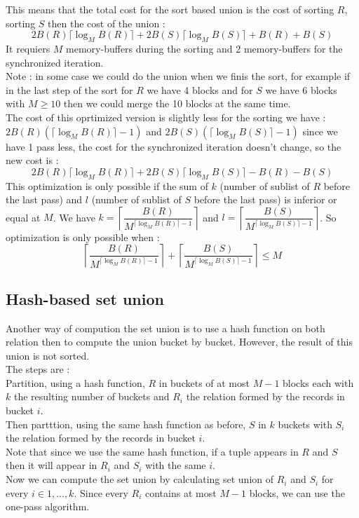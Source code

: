 \documentclass[12pt,a4paper]{article}
\begin{document}
This means that the total cost for the sort based union is the cost of sorting $R$, sorting $S$ then the cost of the union : 
$$2B(R) \lceil \log_M B(R) \rceil + 2B(S) \lceil \log_M B(S) \rceil + B(R) + B(S)$$
It requiers $M$ memory-buffers during the sorting and 2 memory-buffers for the synchronized iteration.\\
Note : in some case we could do the union when we finis the sort, for example if in the last step of the sort for $R$ we have 4 blocks and for $S$ we have 6 blocks with $M \geq 10$ then we could merge the 10 blocks at the same time.\\
The cost of this oprtimized version is slightly less for the sorting we have :\\
$2B(R) (\lceil \log_M B(R) \rceil - 1)$ and $2B(S) (\lceil \log_M B(S) \rceil - 1)$ since we have 1 pass less, the cost for the synchronized iteration doesn't change, so the new cost is :
$$2B(R) \lceil \log_M B(R) \rceil + 2B(S) \lceil \log_M B(S) \rceil - B(R) - B(S)$$
This optimization is only possible if the sum of $k$ (number of sublist of $R$ before the last pass) and $l$ (number of sublist of $S$ before the last pass) is inferior or equal at $M$. We have $k = \left\lceil \dfrac{B(R)}{M^{\lceil \log_M B(R) \rceil - 1}} \right\rceil$ and $l = \left\lceil \dfrac{B(S)}{M^{\lceil \log_M B(S) \rceil - 1}} \right\rceil$. So optimization is only possible when :
$$ \left\lceil \dfrac{B(R)}{M^{\lceil \log_M B(R) \rceil - 1}} \right\rceil + \left\lceil \dfrac{B(S)}{M^{\lceil \log_M B(S) \rceil - 1}} \right\rceil \leq M $$

\subsection{Hash-based set union}
Another way of compution the set union is to use a hash function on both relation then to compute the union bucket by bucket. However, the result of this union is not sorted.\\
The steps are : \\
Partition, using a hash function, $R$ in buckets of at most $M-1$ blocks each with $k$ the resulting number of buckets and $R_i$ the relation formed by the records in bucket $i$.\\
Then partttion, using the same hash function as before, $S$ in $k$ buckets with $S_i$ the relation formed by the records in bucket $i$.\\
Note that since we use the same hash function, if a tuple appears in $R$ and $S$ then it will appear in $R_i$ and $S_i$ with the same $i$.\\
Now we can compute the set union by calculating set union of $R_i$ and $S_i$ for every $i \in 1,...,k$. Since every $R_i$ contains at most $M - 1$ blocks, we can use the one-pass algorithm.\\
\\
\end{document}
